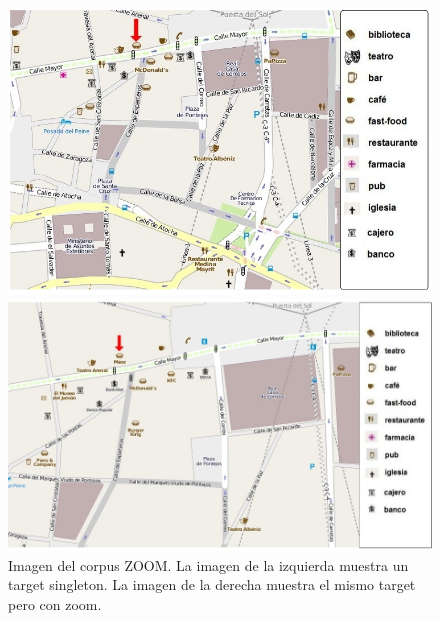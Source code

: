 \begin{figure}
\begin{minipage}[b]{0.48\linewidth}
\centering
\includegraphics[width=\textwidth]{images/corpus/mapa4.png}
\caption{}
\label{mapa3}
\end{minipage}
\hspace*{0cm}
\begin{minipage}[b]{0.55\linewidth}
\centering
\includegraphics[width=\textwidth]{images/corpus/mapa14.png}
\caption{}
\label{mapa4}
\end{minipage}
\caption{Imagen del corpus ZOOM. La imagen de la izquierda muestra un target singleton. La imagen de la derecha muestra el mismo target pero con zoom.}
\end{figure}
